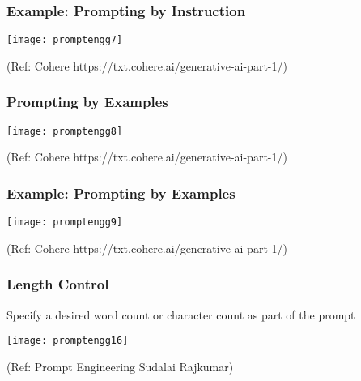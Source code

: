 \begin{frame}[fragile]\frametitle{Example: Prompting by Instruction}

\begin{center}
\texttt{[image: promptengg7]}

{\tiny (Ref: Cohere https://txt.cohere.ai/generative-ai-part-1/)}

\end{center}		

\end{frame}

\begin{frame}[fragile]\frametitle{Prompting by Examples}

\begin{center}
\texttt{[image: promptengg8]}

{\tiny (Ref: Cohere https://txt.cohere.ai/generative-ai-part-1/)}

\end{center}		
		


\end{frame}

\begin{frame}[fragile]\frametitle{Example: Prompting by Examples}

\begin{center}
\texttt{[image: promptengg9]}

{\tiny (Ref: Cohere https://txt.cohere.ai/generative-ai-part-1/)}

\end{center}		
		
\end{frame}

\begin{frame}[fragile]\frametitle{Length Control}

Specify a desired word count or character count as part of the prompt

\begin{center}
\texttt{[image: promptengg16]}

{\tiny (Ref: Prompt Engineering Sudalai Rajkumar)}

\end{center}		

\end{frame}

